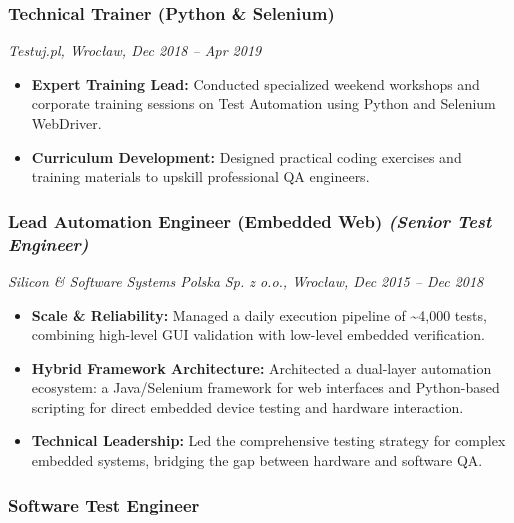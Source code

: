 \documentclass[10pt,a4paper]{article}
\providecommand{\tightlist}{%
  \setlength{\itemsep}{0pt}\setlength{\parskip}{0pt}}
\begin{document}
\subsubsection{Technical Trainer (Python \&
Selenium)}\label{technical-trainer-python-selenium}

\emph{Testuj.pl, Wrocław, Dec 2018 -- Apr 2019}

\begin{itemize}
\tightlist
\item
  \textbf{Expert Training Lead:} Conducted specialized weekend workshops
  and corporate training sessions on Test Automation using Python and
  Selenium WebDriver.
\item
  \textbf{Curriculum Development:} Designed practical coding exercises
  and training materials to upskill professional QA engineers.
\end{itemize}

\subsubsection{\texorpdfstring{Lead Automation Engineer (Embedded Web)
\emph{(Senior Test
Engineer)}}{Lead Automation Engineer (Embedded Web) (Senior Test Engineer)}}\label{lead-automation-engineer-embedded-web-senior-test-engineer}

\emph{Silicon \& Software Systems Polska Sp. z o.o., Wrocław, Dec 2015
-- Dec 2018}

\begin{itemize}
\tightlist
\item
  \textbf{Scale \& Reliability:} Managed a daily execution pipeline of
  \textasciitilde4,000 tests, combining high-level GUI validation with
  low-level embedded verification.
\item
  \textbf{Hybrid Framework Architecture:} Architected a dual-layer
  automation ecosystem: a Java/Selenium framework for web interfaces and
  Python-based scripting for direct embedded device testing and hardware
  interaction.
\item
  \textbf{Technical Leadership:} Led the comprehensive testing strategy
  for complex embedded systems, bridging the gap between hardware and
  software QA.
\end{itemize}

\subsubsection{Software Test Engineer}\label{software-test-engineer}
\end{document}
